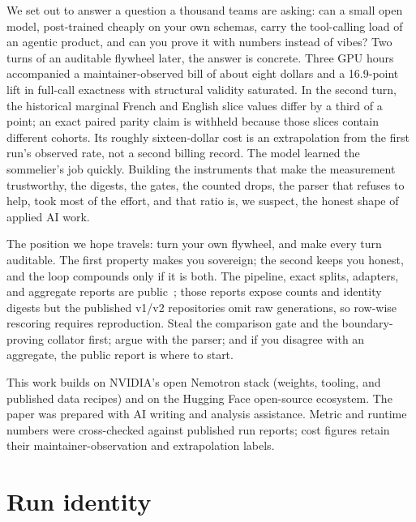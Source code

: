 \documentclass{article}
\begin{document}
We set out to answer a question a thousand teams are asking: can a small open model, post-trained cheaply on your own schemas, carry the tool-calling load of an agentic product, and can you prove it with numbers instead of vibes? Two turns of an auditable flywheel later, the answer is concrete. Three GPU hours accompanied a maintainer-observed bill of about eight dollars and a 16.9-point lift in full-call exactness with structural validity saturated. In the second turn, the historical marginal French and English slice values differ by a third of a point; an exact paired parity claim is withheld because those slices contain different cohorts. Its roughly sixteen-dollar cost is an extrapolation from the first run's observed rate, not a second billing record. The model learned the sommelier's job quickly. Building the instruments that make the measurement trustworthy, the digests, the gates, the counted drops, the parser that refuses to help, took most of the effort, and that ratio is, we suspect, the honest shape of applied AI work.

The position we hope travels: turn your own flywheel, and make every turn auditable. The first property makes you sovereign; the second keeps you honest, and the loop compounds only if it is both. The pipeline, exact splits, adapters, and aggregate reports are public~\citep{bakhta2026sommelier}; those reports expose counts and identity digests but the published v1/v2 repositories omit raw generations, so row-wise rescoring requires reproduction. Steal the comparison gate and the boundary-proving collator first; argue with the parser; and if you disagree with an aggregate, the public report is where to start.

\begin{ack}
This work builds on NVIDIA's open Nemotron stack (weights, tooling, and published data recipes) and on the Hugging Face open-source ecosystem. The paper was prepared with AI writing and analysis assistance. Metric and runtime numbers were cross-checked against published run reports; cost figures retain their maintainer-observation and extrapolation labels.
\end{ack}




\appendix

\section{Run identity}
\label{app:identity}
\end{document}

